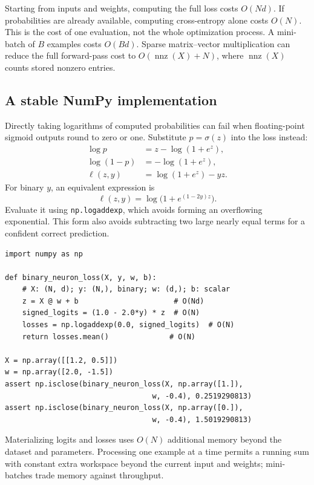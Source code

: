 \begin{keyidea}
Starting from inputs and weights, computing the full loss costs $O(Nd)$. If probabilities are already available, computing cross-entropy alone costs $O(N)$. This is the cost of one evaluation, not the whole optimization process. A mini-batch of $B$ examples costs $O(Bd)$. Sparse matrix--vector multiplication can reduce the full forward-pass cost to $O(\operatorname{nnz}(X)+N)$, where $\operatorname{nnz}(X)$ counts stored nonzero entries.
\end{keyidea}

\subsection{A stable NumPy implementation}
Directly taking logarithms of computed probabilities can fail when floating-point sigmoid outputs round to zero or one. Substitute $p=\sigma(z)$ into the loss instead:
\begin{align}
 \log p &= z-\log(1+e^z),\\
 \log(1-p)&=-\log(1+e^z),\\
 \ell(z,y)&=\log(1+e^z)-yz.
\end{align}
For binary $y$, an equivalent expression is
\[
 \ell(z,y)=\log\bigl(1+e^{(1-2y)z}\bigr).
\]
Evaluate it using \texttt{np.logaddexp}, which avoids forming an overflowing exponential. This form also avoids subtracting two large nearly equal terms for a confident correct prediction.
\begin{lstlisting}
import numpy as np

def binary_neuron_loss(X, y, w, b):
    # X: (N, d); y: (N,), binary; w: (d,); b: scalar
    z = X @ w + b                      # O(Nd)
    signed_logits = (1.0 - 2.0*y) * z  # O(N)
    losses = np.logaddexp(0.0, signed_logits)  # O(N)
    return losses.mean()              # O(N)

X = np.array([[1.2, 0.5]])
w = np.array([2.0, -1.5])
assert np.isclose(binary_neuron_loss(X, np.array([1.]),
                                  w, -0.4), 0.2519290813)
assert np.isclose(binary_neuron_loss(X, np.array([0.]),
                                  w, -0.4), 1.5019290813)
\end{lstlisting}
Materializing logits and losses uses $O(N)$ additional memory beyond the dataset and parameters. Processing one example at a time permits a running sum with constant extra workspace beyond the current input and weights; mini-batches trade memory against throughput.

